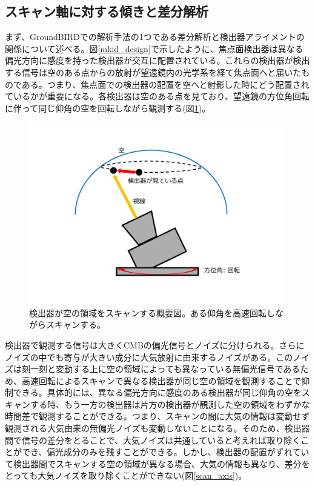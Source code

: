 \subsection{スキャン軸に対する傾きと差分解析}
\label{scan_pair_diff}
まず、GroundBIRDでの解析手法の1つである差分解析と検出器アライメントの関係について述べる。図\ref{mkid_design}で示したように、焦点面検出器は異なる偏光方向に感度を持った検出器が交互に配置されている。これらの検出器が検出する信号は空のある点からの放射が望遠鏡内の光学系を経て焦点面へと届いたものである。つまり、焦点面での検出器の配置を空へと射影した時にどう配置されているかが重要になる。各検出器は空のある点を見ており、望遠鏡の方位角回転に伴って同じ仰角の空を回転しながら観測する(図\ref{scan_image})。
\begin{figure}[htbp]
  \centering
  \includegraphics[width=0.6\columnwidth]{5_alignment/figs/scan_image.pdf}
  \caption{検出器が空の領域をスキャンする概要図。ある仰角を高速回転しながらスキャンする。}
  \label{scan_image}
\end{figure}
検出器で観測する信号は大きくCMBの偏光信号とノイズに分けられる。さらにノイズの中でも寄与が大きい成分に大気放射に由来するノイズがある。このノイズは刻一刻と変動する上に空の領域によっても異なっている無偏光信号であるため、高速回転によるスキャンで異なる検出器が同じ空の領域を観測することで抑制できる。具体的には、異なる偏光方向に感度のある検出器が同じ仰角の空をスキャンする時、もう一方の検出器は片方の検出器が観測した空の領域をわずかな時間差で観測することができる。つまり、スキャンの間に大気の情報は変動せず観測される大気由来の無偏光ノイズも変動しないことになる。そのため、検出器間で信号の差分をとることで、大気ノイズは共通していると考えれば取り除くことができ、偏光成分のみを残すことができる。しかし、検出器の配置がずれていて検出器間でスキャンする空の領域が異なる場合、大気の情報も異なり、差分をとっても大気ノイズを取り除くことができない(図\ref{scan_axis})。
